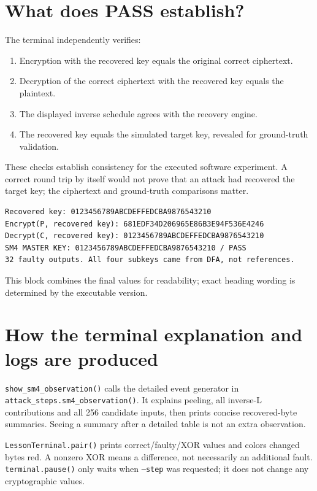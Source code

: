\documentclass[11pt,a4paper]{report}
\begin{document}
\section{What does PASS establish?}
The terminal independently verifies:
\begin{enumerate}
\item Encryption with the recovered key equals the original correct ciphertext.
\item Decryption of the correct ciphertext with the recovered key equals the plaintext.
\item The displayed inverse schedule agrees with the recovery engine.
\item The recovered key equals the simulated target key, revealed for ground-truth validation.
\end{enumerate}
These checks establish consistency for the executed software experiment. A correct round trip by itself would not prove that an attack had recovered the target key; the ciphertext and ground-truth comparisons matter.
\begin{Verbatim}[numbers=none]
Recovered key: 0123456789ABCDEFFEDCBA9876543210
Encrypt(P, recovered key): 681EDF34D206965E86B3E94F536E4246
Decrypt(C, recovered key): 0123456789ABCDEFFEDCBA9876543210
SM4 MASTER KEY: 0123456789ABCDEFFEDCBA9876543210 / PASS
32 faulty outputs. All four subkeys came from DFA, not references.
\end{Verbatim}
This block combines the final values for readability; exact heading wording is determined by the executable version.

\section{How the terminal explanation and logs are produced}
\texttt{show\_sm4\_observation()} calls the detailed event generator in \texttt{attack\_steps.sm4\_observation()}. It explains peeling, all inverse-L contributions and all 256 candidate inputs, then prints concise recovered-byte summaries. Seeing a summary after a detailed table is not an extra observation.

\texttt{LessonTerminal.pair()} prints correct/faulty/XOR values and colors changed bytes red. A nonzero XOR means a difference, not necessarily an additional fault. \texttt{terminal.pause()} only waits when \texttt{--step} was requested; it does not change any cryptographic values.
\end{document}
